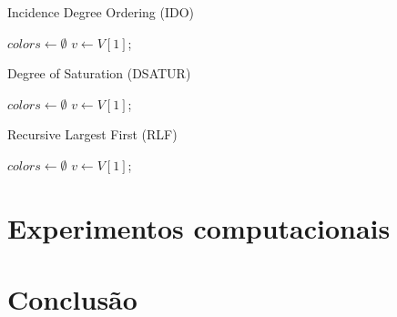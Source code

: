 \documentclass[10pt]{article}
\begin{document}
\begin{multicols*}{2}
\begin{algorithm}[H]
\caption{Incidence Degree Ordering (IDO)}
\label{alg:ido}


$colors \gets \emptyset$\;
$v \gets V[1]$;

\end{algorithm}



\begin{algorithm}[H]
\caption{Degree of Saturation (DSATUR)}
\label{alg:dsatur}


$colors \gets \emptyset$\;
$v \gets V[1]$;

\end{algorithm}



\begin{algorithm}[H]
\caption{Recursive Largest First (RLF)}
\label{alg:rlf}


$colors \gets \emptyset$\;
$v \gets V[1]$;

\end{algorithm}


\section{Experimentos computacionais}
    \lipsum

\section{Conclusão}

\end{multicols*}
\end{document}
